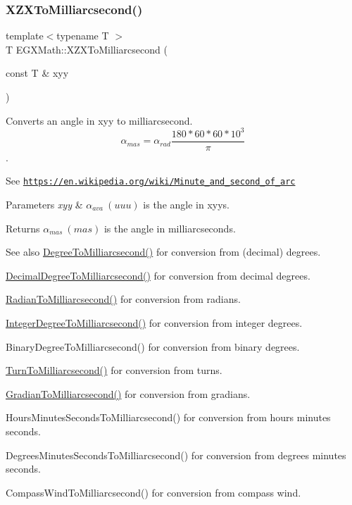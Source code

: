 \subsubsection{\texorpdfstring{X\+Z\+X\+To\+Milliarcsecond()}{XZXToMilliarcsecond()}}
{\footnotesize\ttfamily template$<$typename T $>$ \\
T E\+G\+X\+Math\+::\+X\+Z\+X\+To\+Milliarcsecond (\begin{DoxyParamCaption}\item[{const T \&}]{xyy }\end{DoxyParamCaption})}



Converts an angle in xyy to milliarcsecond. \[\alpha_{mas}=\alpha_{rad}\frac{180 * 60 * 60 * 10^3}{\pi}\]. 

See \href{https://en.wikipedia.org/wiki/Minute_and_second_of_arc}{\tt https\+://en.\+wikipedia.\+org/wiki/\+Minute\+\_\+and\+\_\+second\+\_\+of\+\_\+arc} 
\begin{DoxyParams}{Parameters}
{\em xyy} & $\alpha_{ava}\ (uuu)$ is the angle in xyys. \\
\hline
\end{DoxyParams}
\begin{DoxyReturn}{Returns}
$\alpha_{mas}\ (mas)$ is the angle in milliarcseconds. 
\end{DoxyReturn}
\begin{DoxySeeAlso}{See also}
\mbox{\hyperlink{group___e_g_x_math-_angle_conversions-_degree_ga2c218e286b2ef72a00734dbc5a7f5ab6}{Degree\+To\+Milliarcsecond()}} for conversion from (decimal) degrees. 

\mbox{\hyperlink{group___e_g_x_math-_angle_conversions-_decimal_degree_gadb9ff3c92cf7484793f91e7de80c222e}{Decimal\+Degree\+To\+Milliarcsecond()}} for conversion from decimal degrees. 

\mbox{\hyperlink{group___e_g_x_math-_angle_conversions-_radian_ga84fbb494a455cfeb30be62776f96c9a9}{Radian\+To\+Milliarcsecond()}} for conversion from radians. 

\mbox{\hyperlink{group___e_g_x_math-_angle_conversions-_integer_degree_gadc43f22e832cd8fcf16b7bd2269ae348}{Integer\+Degree\+To\+Milliarcsecond()}} for conversion from integer degrees. 

Binary\+Degree\+To\+Milliarcsecond() for conversion from binary degrees. 

\mbox{\hyperlink{group___e_g_x_math-_angle_conversions-_turn_ga05d6fea8f8475831e93dd23f6196393f}{Turn\+To\+Milliarcsecond()}} for conversion from turns. 

\mbox{\hyperlink{group___e_g_x_math-_angle_conversions-_gradian_gad77ea0956413029f4166dce8d7f5ce83}{Gradian\+To\+Milliarcsecond()}} for conversion from gradians. 

Hours\+Minutes\+Seconds\+To\+Milliarcsecond() for conversion from hours minutes seconds. 

Degrees\+Minutes\+Seconds\+To\+Milliarcsecond() for conversion from degrees minutes seconds. 

Compass\+Wind\+To\+Milliarcsecond() for conversion from compass wind. 
\end{DoxySeeAlso}
